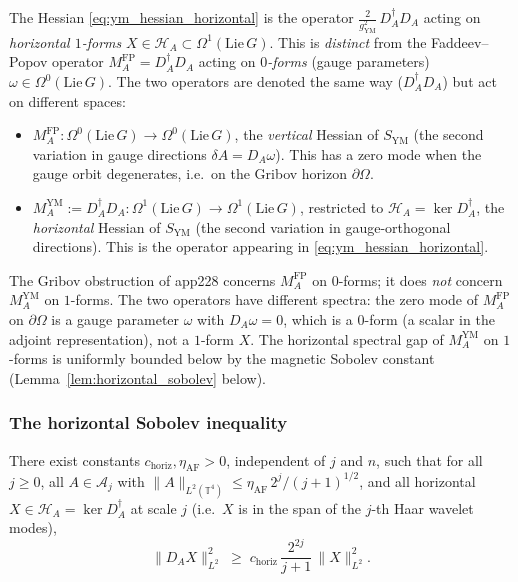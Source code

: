 \begin{remark}
\label{rem:two_hessians}
The Hessian \eqref{eq:ym_hessian_horizontal} is the operator
$\tfrac{2}{g_{\mathrm{YM}}^{2}}\,D_{A}^{\dagger}D_{A}$ acting on
\emph{horizontal $1$-forms} $X\in\mathcal{H}_{A}\subset
\Omega^{1}(\mathrm{Lie}\,G)$. This is \emph{distinct} from the
Faddeev--Popov operator
$M_{A}^{\mathrm{FP}}=D_{A}^{\dagger}D_{A}$ acting on
\emph{$0$-forms} (gauge parameters)
$\omega\in\Omega^{0}(\mathrm{Lie}\,G)$. The two operators are
denoted the same way ($D_{A}^{\dagger}D_{A}$) but act on
different spaces:
\begin{itemize}
\item $M_{A}^{\mathrm{FP}}:\Omega^{0}(\mathrm{Lie}\,G)\to
\Omega^{0}(\mathrm{Lie}\,G)$, the \emph{vertical} Hessian of
$S_{\mathrm{YM}}$ (the second variation in gauge directions
$\delta A=D_{A}\omega$). This has a zero mode when the gauge
orbit degenerates, i.e.\ on the Gribov horizon $\partial\Omega$.
\item $M_{A}^{\mathrm{YM}}:=D_{A}^{\dagger}D_{A}:
\Omega^{1}(\mathrm{Lie}\,G)\to\Omega^{1}(\mathrm{Lie}\,G)$,
restricted to $\mathcal{H}_{A}=\ker D_{A}^{\dagger}$, the
\emph{horizontal} Hessian of $S_{\mathrm{YM}}$ (the second
variation in gauge-orthogonal directions). This is the operator
appearing in \eqref{eq:ym_hessian_horizontal}.
\end{itemize}
The Gribov obstruction of app228 concerns $M_{A}^{\mathrm{FP}}$
on $0$-forms; it does \emph{not} concern $M_{A}^{\mathrm{YM}}$
on $1$-forms. The two operators have different spectra: the
zero mode of $M_{A}^{\mathrm{FP}}$ on $\partial\Omega$ is a
gauge parameter $\omega$ with $D_{A}\omega=0$, which is a
$0$-form (a scalar in the adjoint representation), not a
$1$-form $X$. The horizontal spectral gap of
$M_{A}^{\mathrm{YM}}$ on $1$-forms is uniformly bounded below
by the magnetic Sobolev constant (Lemma~\ref{lem:horizontal_sobolev}
below).
\end{remark}

\subsubsection{The horizontal Sobolev inequality}

\begin{lemma}
\label{lem:horizontal_sobolev}
There exist constants $c_{\mathrm{horiz}},\eta_{\mathrm{AF}}>0$,
independent of $j$ and $n$, such that for all $j\ge 0$, all
$A\in\mathcal{A}_{j}$ with $\|A\|_{L^{2}(\mathbb{T}^{4})}\le
\eta_{\mathrm{AF}}\,2^{j}/(j+1)^{1/2}$, and all horizontal
$X\in\mathcal{H}_{A}=\ker D_{A}^{\dagger}$ at scale $j$
(i.e.\ $X$ is in the span of the $j$-th Haar wavelet modes),
\begin{equation}
\label{eq:horizontal_sobolev}
  \|D_{A}X\|_{L^{2}}^{2}
  \;\ge\;c_{\mathrm{horiz}}\,\frac{2^{2j}}{j+1}\,
  \|X\|_{L^{2}}^{2}.
\end{equation}
\end{lemma}

